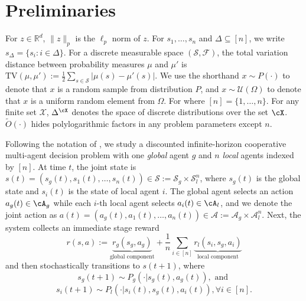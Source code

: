 \section{Preliminaries}
\label{sec: preliminaries}


For $z\!\in\!\mathbb R^d$, $\|z\|_p$ is the $\ell_p$ norm of $z$. For $s_1,\dots, s_n$ and $\Delta\subseteq [n]$, we write $s_\Delta\!=\!\{s_i:i\!\in\!\Delta\}$. For a discrete measurable space $(\mathcal{S}, \mathcal{F})$, the total variation distance between probability measures $\mu$ and $\mu'$ is $\mathrm{TV}(\mu, \mu') := \frac{1}{2}\sum_{s\in\mathcal{S}}|\mu(s)\!-\!\mu'(s)|$. We use the shorthand $x\sim P(\cdot)$ to denote that $x$ is a random sample from distribution $P$, and $x \sim \mathcal{U}(\Omega)$ to denote that $x$ is a uniform random element from $\Omega$. 
For  where $[n]\!=\!\{1,\dots,n\}$. For any finite set $\mathcal{X}$, $\Delta^{\cX}$ denotes the space of discrete distributions over the set $\cX$. $\tilde{O}(\cdot)$ hides polylogarithmic factors in any problem parameters except $n$.


Following the notation of \citet{anand2025meanfield}, we study a discounted infinite-horizon cooperative multi-agent decision problem with one \emph{global} agent $g$
and $n$ \emph{local} agents indexed by $[n]$. At time $t$, the joint state is
$s(t) = (s_g(t), s_1(t),\ldots,s_n(t)) \in \mathcal S := \mathcal S_g \times \mathcal S_l^n$,
where $s_g(t)$ is the global state and $s_i(t)$ is the state of local agent $i$. The global agent selects an action $a_g(t)\in\cA_g$ while each $i$-th local agent selects $a_i(t)\in\cA_l$, and we denote the joint action as $a(t)=(a_g(t),a_1(t),\ldots,a_n(t)) \in \mathcal A := \mathcal A_g \times \mathcal A_l^n$. Next, the system collects an immediate stage reward
\begin{equation}\label{equation:rewards}
    r(s, a) := \underbrace{r_g(s_g, a_g)}_{{\text{global component}}} + \frac{1}{n} \sum_{i\in [n]} \underbrace{r_l(s_i, s_g, a_i)}_{\text{local component}}
\end{equation}
and then stochastically transitions to $s(t+1)$, where
\begin{equation}\label{equation: global_transition}s_g(t+1) \sim P_g(\cdot|s_g(t), a_g(t)), \text{ and }\end{equation}
\begin{equation}\label{equation: local_transition}s_i(t+1) \sim P_l(\cdot|s_i(t), s_g(t), a_i(t)), \forall i\in [n].\end{equation}

